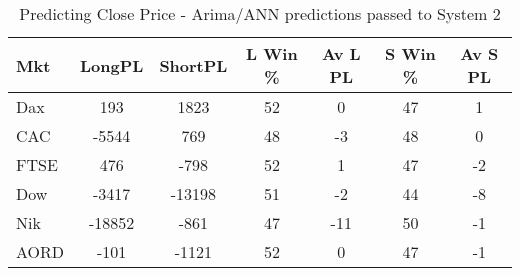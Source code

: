 \begin{table}[ht]
\centering
\caption[Predicting Close Price - Arima/ANN predictions passed to System 2.]{Predicting Close Price - Arima/ANN predictions passed to System 2} 
\label{tab:chp_ts:arima_ann_sys2}
\begin{tabular}{lcccccc}
  \toprule Mkt & LongPL & ShortPL & L Win \% & Av L PL & S Win \% & Av S PL \\ 
  \midrule Dax & 193 & 1823 & 52 & 0 & 47 & 1 \\ 
  CAC & -5544 & 769 & 48 & -3 & 48 & 0 \\ 
  FTSE & 476 & -798 & 52 & 1 & 47 & -2 \\ 
  Dow & -3417 & -13198 & 51 & -2 & 44 & -8 \\ 
  Nik & -18852 & -861 & 47 & -11 & 50 & -1 \\ 
  AORD & -101 & -1121 & 52 & 0 & 47 & -1 \\ 
   \bottomrule \end{tabular}
\end{table}
